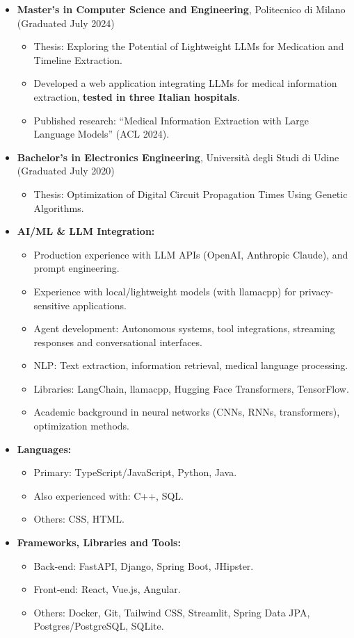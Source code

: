\documentclass[a4paper,9pt]{article}
\newcommand{\cvsection}[2]{
    \vspace{0.3cm} %
    \noindent {\large \textbf{#1}} %
    \begin{itemize}
        \renewcommand{\labelitemi}{}
        \small #2 %
    \end{itemize}
}
\begin{document}
\cvsection{Education}{
    \item \textbf{Master's in Computer Science and Engineering}, Politecnico di Milano (Graduated July 2024)
    \begin{itemize}
        \item Thesis: Exploring the Potential of Lightweight LLMs for Medication and Timeline Extraction.
        \item Developed a web application integrating LLMs for medical information extraction, \textbf{tested in three Italian hospitals}.
        \item Published research: ``Medical Information Extraction with Large Language Models'' (ACL 2024).
    \end{itemize}
    \item \textbf{Bachelor's in Electronics Engineering}, Università degli Studi di Udine (Graduated July 2020)
    \begin{itemize}
        \item Thesis: Optimization of Digital Circuit Propagation Times Using Genetic Algorithms.
    \end{itemize}
}

\cvsection{Technical Skills}{
    \item \textbf{AI/ML \& LLM Integration:}
    \begin{itemize}
        \item Production experience with LLM APIs (OpenAI, Anthropic Claude), and prompt engineering.
        \item Experience with local/lightweight models (with llamacpp) for privacy-sensitive applications.
        \item Agent development: Autonomous systems, tool integrations, streaming responses and conversational interfaces.
        \item NLP: Text extraction, information retrieval, medical language processing.
        \item Libraries: LangChain, llamacpp, Hugging Face Transformers, TensorFlow.
        \item Academic background in neural networks (CNNs, RNNs, transformers), optimization methods.
    \end{itemize}
    \item \textbf{Languages:}
    \begin{itemize}
        \item Primary: TypeScript/JavaScript, Python, Java.
        \item Also experienced with: C++, SQL.
        \item Others: CSS, HTML. 
    \end{itemize}
    \item \textbf{Frameworks, Libraries and Tools:}
    \begin{itemize}
        \item Back-end: FastAPI, Django, Spring Boot, JHipster.
        \item Front-end: React, Vue.js, Angular.
    \item Others: Docker, Git, Tailwind CSS, Streamlit, Spring Data JPA, Postgres/PostgreSQL, SQLite.
    \end{itemize}
}
\end{document}
